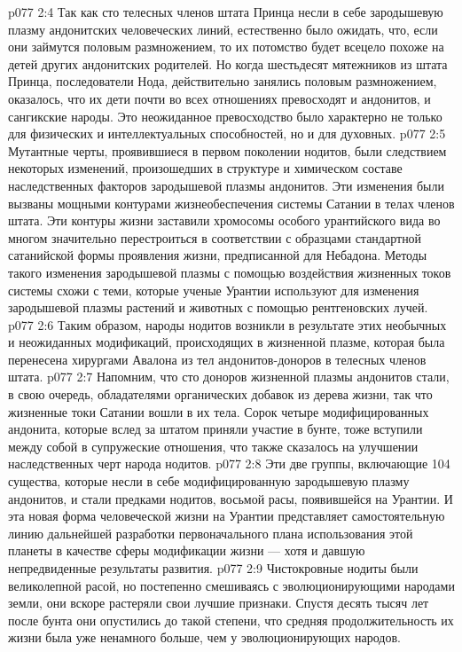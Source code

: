 \vs p077 2:4 Так как сто телесных членов штата Принца несли в себе зародышевую плазму андонитских человеческих линий, естественно было ожидать, что, если они займутся половым размножением, то их потомство будет всецело похоже на детей других андонитских родителей. Но когда шестьдесят мятежников из штата Принца, последователи Нода, действительно занялись половым размножением, оказалось, что их дети почти во всех отношениях превосходят и андонитов, и сангикские народы. Это неожиданное превосходство было характерно не только для физических и интеллектуальных способностей, но и для духовных.
\vs p077 2:5 Мутантные черты, проявившиеся в первом поколении нодитов, были следствием некоторых изменений, произошедших в структуре и химическом составе наследственных факторов зародышевой плазмы андонитов. Эти изменения были вызваны мощными контурами жизнеобеспечения системы Сатании в телах членов штата. Эти контуры жизни заставили хромосомы особого урантийского вида во многом значительно перестроиться в соответствии с образцами стандартной сатанийской формы проявления жизни, предписанной для Небадона. Методы такого изменения зародышевой плазмы с помощью воздействия жизненных токов системы схожи с теми, которые ученые Урантии используют для изменения зародышевой плазмы растений и животных с помощью рентгеновских лучей.
\vs p077 2:6 Таким образом, народы нодитов возникли в результате этих необычных и неожиданных модификаций, происходящих в жизненной плазме, которая была перенесена хирургами Авалона из тел андонитов\hyp{}доноров в телесных членов штата.
\vs p077 2:7 \pc Напомним, что сто доноров жизненной плазмы андонитов стали, в свою очередь, обладателями органических добавок из дерева жизни, так что жизненные токи Сатании вошли в их тела. Сорок четыре модифицированных андонита, которые вслед за штатом приняли участие в бунте, тоже вступили между собой в супружеские отношения, что также сказалось на улучшении наследственных черт народа нодитов.
\vs p077 2:8 Эти две группы, включающие 104 существа, которые несли в себе модифицированную зародышевую плазму андонитов, и стали предками нодитов, восьмой расы, появившейся на Урантии. И эта новая форма человеческой жизни на Урантии представляет самостоятельную линию дальнейшей разработки первоначального плана использования этой планеты в качестве сферы модификации жизни --- хотя и давшую непредвиденные результаты развития.
\vs p077 2:9 \pc Чистокровные нодиты были великолепной расой, но постепенно смешиваясь с эволюционирующими народами земли, они вскоре растеряли свои лучшие признаки. Спустя десять тысяч лет после бунта они опустились до такой степени, что средняя продолжительность их жизни была уже ненамного больше, чем у эволюционирующих народов.
